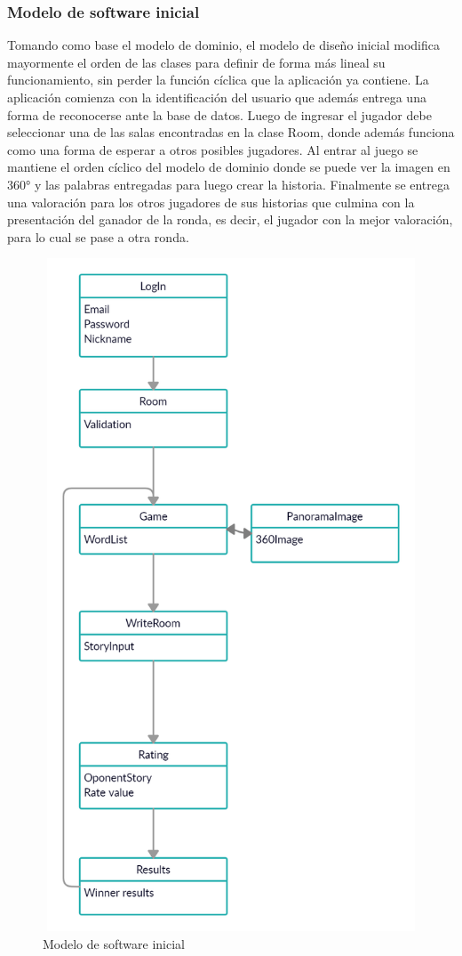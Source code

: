 \documentclass[12pt]{article}
\begin{document}
\subsubsection{Modelo de software inicial}
Tomando como base el modelo de dominio, el modelo de diseño inicial modifica mayormente el orden de las clases para definir de forma más lineal su funcionamiento, sin perder la función cíclica que la aplicación ya contiene.
La aplicación comienza con la identificación del usuario que además entrega una forma de reconocerse ante la base de datos. Luego de ingresar el jugador debe seleccionar una de las salas encontradas en la clase Room, donde además funciona como una forma de esperar a otros posibles jugadores. Al entrar al juego se mantiene el orden cíclico del modelo de dominio donde se puede ver la imagen en 360° y las palabras entregadas para luego crear la historia. Finalmente se entrega una valoración para los otros jugadores de sus historias que culmina con la presentación del ganador de la ronda, es decir, el jugador con la mejor valoración, para lo cual se pase a otra ronda.
\begin{figure}[H]
	\includegraphics[width=16cm, height=20cm]{imgs/ModeloSoftwareInicial.jpg}
	\caption{Modelo de software inicial}
\end{figure}
\end{document}
